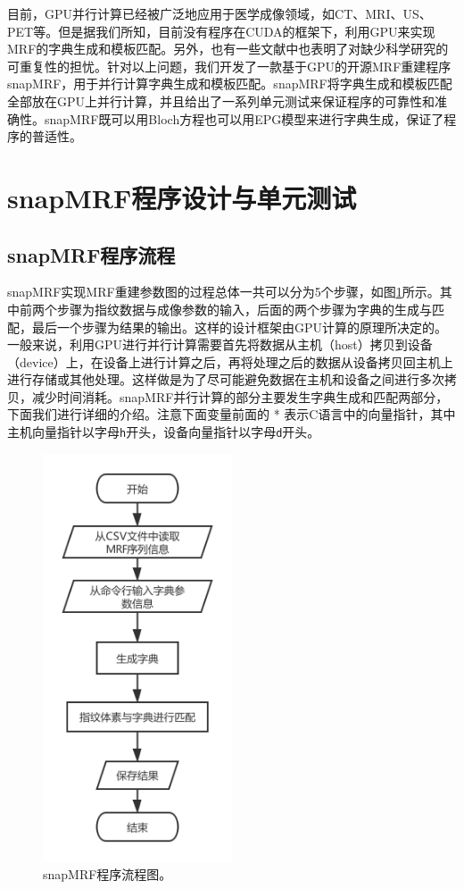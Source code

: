 目前，GPU并行计算已经被广泛地应用于医学成像领域，如CT\cite{biguri2016tigre,palenstijn2011performance}、MRI\cite{Knoll,Sorensen,tron,Eklund2014BROCCOLI,Xanthis2014MRISIMUL}、US\cite{Jung2013GPU,Yakang2010Real}、PET\cite{Garcia2016Accelerated,Cui2013Distributed}等。但是据我们所知，目前没有程序在CUDA的框架下，利用GPU来实现MRF的字典生成和模板匹配。另外，也有一些文献中也表明了对缺少科学研究的可重复性的担忧\cite{vasilevsy_repro_2013,collins_repro_2014,begley_repro_2015}。针对以上问题，我们开发了一款基于GPU的开源MRF重建程序snapMRF，用于并行计算字典生成和模板匹配。snapMRF将字典生成和模板匹配全部放在GPU上并行计算，并且给出了一系列单元测试来保证程序的可靠性和准确性。snapMRF既可以用Bloch方程也可以用EPG模型来进行字典生成，保证了程序的普适性。

\section{snapMRF程序设计与单元测试}
\subsection{snapMRF程序流程}
snapMRF实现MRF重建参数图的过程总体一共可以分为5个步骤，如图\ref{fig:snapmrf}所示。其中前两个步骤为指纹数据与成像参数的输入，后面的两个步骤为字典的生成与匹配，最后一个步骤为结果的输出。这样的设计框架由GPU计算的原理所决定的。一般来说，利用GPU进行并行计算需要首先将数据从主机（host）拷贝到设备（device）上，在设备上进行计算之后，再将处理之后的数据从设备拷贝回主机上进行存储或其他处理。这样做是为了尽可能避免数据在主机和设备之间进行多次拷贝，减少时间消耗。snapMRF并行计算的部分主要发生字典生成和匹配两部分，下面我们进行详细的介绍。注意下面变量前面的 * 表示C语言中的向量指针，其中主机向量指针以字母\texttt{h}开头，设备向量指针以字母\texttt{d}开头。
\begin{figure}
\centering
 \includegraphics[width=0.5\textwidth]{img/snapmrf/snapMRF.png}
\caption{snapMRF程序流程图。}
\label{fig:snapmrf}
\end{figure}

